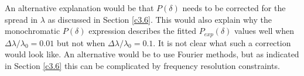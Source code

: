 An alternative explanation would be that $P(\delta)$ needs to be corrected for the spread in $\lambda$ as discussed in Section \ref{c3.6}. This would also explain why the monochromatic $P(\delta)$ expression describes the fitted $P_{exp}(\delta)$ values well when $\Delta\lambda/\lambda_0 = 0.01$ but not when $\Delta\lambda/\lambda_0 = 0.1$. It is not clear what such a correction would look like. An alternative would be to use Fourier methods, but as indicated in Section \ref{c3.6} this can be complicated by frequency resolution constraints. 






